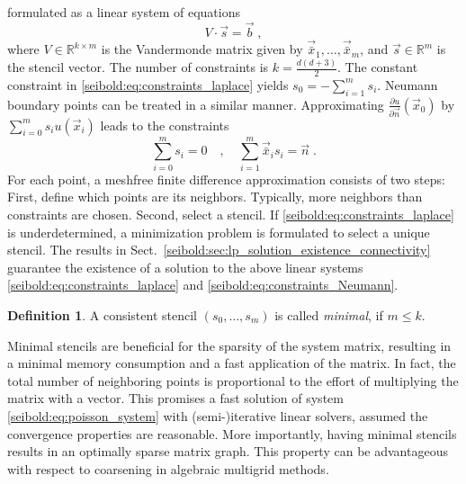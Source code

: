 \documentclass[reqno]{amsart}
\theoremstyle{plain}
\theoremstyle{definition}
\newtheorem{defn}{Definition}
\theoremstyle{remark}
\begin{document}
formulated as a linear system of equations
\begin{equation}
V\cdot\vec{s} = \vec{b}\;,
\label{seibold:eq:linear_system}
\end{equation}
where $V\in\mathbb{R}^{k\times m}$ is the Vandermonde matrix given
by $\vec{\bar x}_1,\dots,\vec{\bar x}_m$, and $\vec{s}\in\mathbb{R}^m$ is the
stencil vector.
The number of constraints is $k = \frac{d(d+3)}{2}$.
The constant constraint in \eqref{seibold:eq:constraints_laplace} yields
$s_0 = -\sum_{i=1}^m s_i$.
Neumann boundary points can be treated in a similar manner.
Approximating ${\frac{\partial{u}}{\partial{\vec{n}}}}(\vec{x}_0)$ by $\sum_{i=0}^m s_i u(\vec{x}_i)$
leads to the constraints
\begin{equation}
\sum_{i=0}^m s_i = 0 \quad , \quad
\sum_{i=1}^m\vec{\bar x}_i s_i = \vec{n}\;.
\label{seibold:eq:constraints_Neumann}
\end{equation}
For each point, a meshfree finite difference approximation consists of two steps:
First, define which points are its neighbors. Typically, more neighbors than
constraints are chosen. Second, select a stencil.
If \eqref{seibold:eq:constraints_laplace} is underdetermined, a minimization problem
is formulated to select a unique stencil.
The results in Sect.~\ref{seibold:sec:lp_solution_existence_connectivity} guarantee
the existence of a solution to the above linear
systems \eqref{seibold:eq:constraints_laplace}
and \eqref{seibold:eq:constraints_Neumann}.

\begin{defn}
\label{seibold:def:minimal_stencil}
A consistent stencil $(s_0,\dots,s_m)$ is called \emph{minimal}, if $m\le k$.
\end{defn}
Minimal stencils are beneficial for the sparsity of the system matrix, resulting in a
minimal memory consumption and a fast application of the matrix. In fact, the total
number of neighboring points is proportional to the effort of multiplying the matrix
with a vector. This promises a fast solution of system \eqref{seibold:eq:poisson_system}
with (semi-)iterative linear solvers, assumed the convergence properties are reasonable.
More importantly, having minimal stencils results in an optimally sparse matrix graph.
This property can be advantageous with respect to coarsening in algebraic
multigrid methods.
\end{document}
